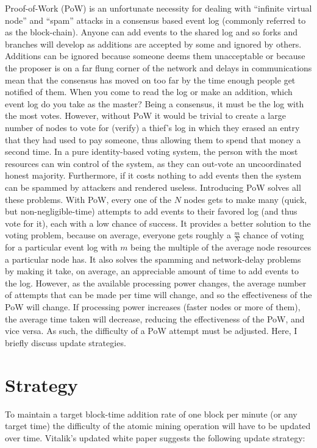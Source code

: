 \documentclass[10pt,a4paper]{article}
\begin{document}
Proof-of-Work (PoW) is an unfortunate necessity for dealing with ``infinite virtual node'' and ``spam'' attacks in a consensus based event log (commonly referred to as the block-chain). Anyone can add events to the shared log and so forks and branches will develop as additions are accepted by some and ignored by others. Additions can be ignored because someone deems them unacceptable or because the proposer is on a far flung corner of the network and delays in communications mean that the consensus has moved on too far by the time enough people get notified of them. When you come to read the log or make an addition, which event log do you take as the master? Being a consensus, it must be the log with the most votes. However, without PoW it would be trivial to create a large number of nodes to vote for (verify) a thief's log in which they erased an entry that they had used to pay someone, thus allowing them to spend that money a second time. In a pure identity-based voting system, the person with the most resources can win control of the system, as they can out-vote an uncoordinated honest majority. Furthermore, if it costs nothing to add events then the system can be spammed by attackers and rendered useless. Introducing PoW solves all these problems. With PoW, every one of the $N$ nodes gets to make many (quick, but non-negligible-time) attempts to add events to their favored log (and thus vote for it), each with a low chance of success. It provides a better solution to the voting problem, because on average, everyone gets roughly a $\frac{m}{N}$ chance of voting for a particular event log with $m$ being the multiple of the average node resources a particular node has. It also solves the spamming and network-delay problems by making it take, on average, an appreciable amount of time to add events to the log. However, as the available processing power changes, the average number of attempts that can be made per time will change, and so the effectiveness of the PoW will change. If processing power increases (faster nodes or more of them), the average time taken will decrease, reducing the effectiveness of the PoW, and vice versa. As such, the difficulty of a PoW attempt must be adjusted. Here, I briefly discuss update strategies.

\section*{Strategy}

To maintain a target block-time addition rate of one block per minute (or any target time) the difficulty of the atomic mining operation will have to be updated over time. Vitalik's updated white paper suggests the following update strategy:
\end{document}
